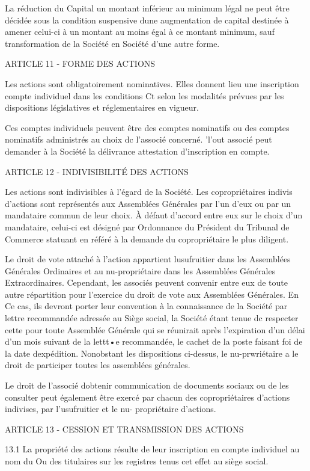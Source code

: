 \documentclass{article}
\begin{document}
La réduction du Capital un montant inférieur au minimum légal ne peut être décidée sous la condition suspensive dune augmentation de capital destinée à amener celui-ci à un montant au moins égal à ce montant minimum, sauf transformation de la Société en Société d'une autre forme.

ARTICLE 11 - FORME DES ACTIONS

Les actions sont obligatoirement nominatives. Elles donnent lieu une inscription compte individuel dans les conditions Ct selon les modalités prévues par les dispositions législatives et réglementaires en vigueur.

Ces comptes individuels peuvent être des comptes nominatifs ou des comptes nominatifs administrés au choix dc l'associé concerné. 'l'out associé peut demander à la Société la délivrance attestation d'inscription en compte.

ARTICLE 12 - INDIVISIBILITÉ DES ACTIONS

Les actions sont indivisibles à l'égard de la Société. Les copropriétaires indivis d'actions sont représentés aux Assemblées Générales par l'un d'eux ou par un mandataire commun de leur choix.  À défaut d'accord entre eux sur le choix d'un mandataire, celui-ci est désigné par Ordonnance du Président du Tribunal de Commerce statuant en référé à la demande du copropriétaire le plus diligent.

Le droit de vote attaché à l'action appartient lusufruitier dans les Assemblées Générales Ordinaires et au nu-propriétaire dans les Assemblées Générales Extraordinaires. Cependant, les associés peuvent convenir entre eux de toute autre répartition pour l'exercice du droit de vote aux Assemblées Générales. En Ce cas, ils devront porter leur convention à la connaissance de la Société par lettre recommandée adressée au Siège social, la Société étant tenue dc respecter cette pour toute Assemblée Générale qui se réunirait après l'expiration d'un délai d'un mois suivant de la lettt•e recommandée, le cachet de la poste faisant foi de la date dexpédition.  Nonobstant les dispositions ci-dessus, le nu-prwriétaire a le droit dc participer toutes les assemblées générales.

Le droit de l'associé dobtenir communication de documents sociaux ou de les consulter peut également être exercé par chacun des copropriétaires d'actions indivises, par l'usufruitier et le nu- propriétaire d'actions.

ARTICLE 13 - CESSION ET TRANSMISSION DES ACTIONS

13.1 La propriété des actions résulte de leur inscription en compte individuel au nom du Ou des titulaires sur les registres tenus cet effet au siège social.
\end{document}
